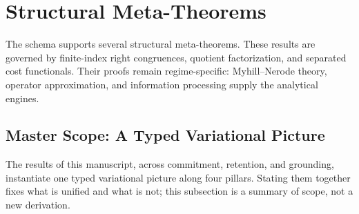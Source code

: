 \documentclass[12pt]{article}
\theoremstyle{definition}
\begin{document}
\section{Structural Meta-Theorems}
\label{sec:meta}

The schema supports several structural meta-theorems.  These results are
governed by finite-index right congruences, quotient factorization, and
separated cost functionals.  Their proofs remain regime-specific:
Myhill--Nerode theory, operator approximation, and information processing
supply the analytical engines.

\subsection{Master Scope: A Typed Variational Picture}
\label{subsec:meta-scope}

The results of this manuscript, across commitment, retention, and grounding,
instantiate one typed variational picture along four pillars.  Stating them
together fixes what is unified and what is not; this subsection is a summary
of scope, not a new derivation.
\end{document}
